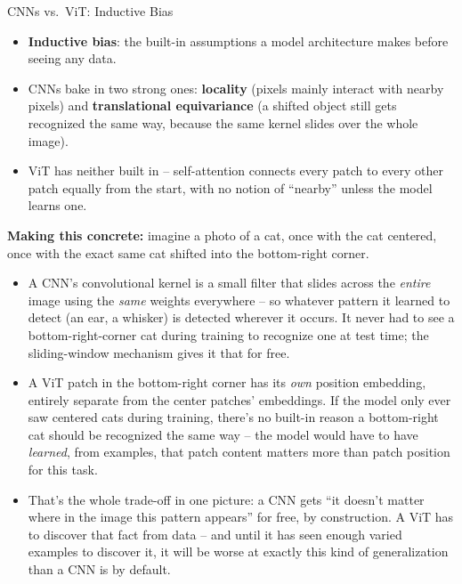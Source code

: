 \begin{vbframe}{CNNs vs.\ ViT: Inductive Bias}
\begin{itemize}
  \item \textbf{Inductive bias}: the built-in assumptions a model architecture makes before seeing any data.
  \item CNNs bake in two strong ones: \textbf{locality} (pixels mainly interact with nearby pixels) and \textbf{translational equivariance} (a shifted object still gets recognized the same way, because the same kernel slides over the whole image).
  \item ViT has neither built in -- self-attention connects every patch to every other patch equally from the start, with no notion of ``nearby'' unless the model learns one.
\end{itemize}

\framebreak

\textbf{Making this concrete:} imagine a photo of a cat, once with the cat centered, once with the exact same cat shifted into the bottom-right corner.
\begin{itemize}
  \item A CNN's convolutional kernel is a small filter that slides across the \emph{entire} image using the \emph{same} weights everywhere -- so whatever pattern it learned to detect (an ear, a whisker) is detected wherever it occurs. It never had to see a bottom-right-corner cat during training to recognize one at test time; the sliding-window mechanism gives it that for free.
  \item A ViT patch in the bottom-right corner has its \emph{own} position embedding, entirely separate from the center patches' embeddings. If the model only ever saw centered cats during training, there's no built-in reason a bottom-right cat should be recognized the same way -- the model would have to have \emph{learned}, from examples, that patch content matters more than patch position for this task.
  \item That's the whole trade-off in one picture: a CNN gets ``it doesn't matter where in the image this pattern appears'' for free, by construction. A ViT has to discover that fact from data -- and until it has seen enough varied examples to discover it, it will be worse at exactly this kind of generalization than a CNN is by default.
\end{itemize}


\end{vbframe}
